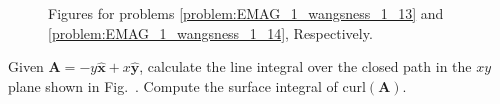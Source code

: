             \begin{figure}[H]
                \centering
                \captionsetup{type=figure}
                \begin{subfigure}[b]{0.49\textwidth}
                    \centering
                    \captionsetup{type=figure}
                    \resizebox{\textwidth}{!}{%
                        
                    }
                    \label{fig:EMAG_1_wangsness_1_13}
                \end{subfigure}
                \begin{subfigure}[b]{0.49\textwidth}
                    \centering
                    \captionsetup{type=figure}
                    \resizebox{\textwidth}{!}{%
                        
                    }
                    \label{fig:EMAG_1_wangsness_1_14}
                \end{subfigure}
                \caption[Figures for Wangsness 1-13 and 1-14]
                    {Figures for problems
                     \ref{problem:EMAG_1_wangsness_1_13} and
                     \ref{problem:EMAG_1_wangsness_1_14},
                     Respectively.}
            \end{figure}
            \begin{problem}[Wangsness 1-14]
                \label{problem:EMAG_1_wangsness_1_14}
                Given
                $\mathbf{A}=\minus{y}\hat{\mathbf{x}}%
                                   +x\hat{\mathbf{y}}$,
                calculate the line integral
                over the closed path in the $xy$ plane shown in
                Fig.~. Compute
                the surface integral of $\mathrm{curl}(\mathbf{A})$.
            \end{problem}
